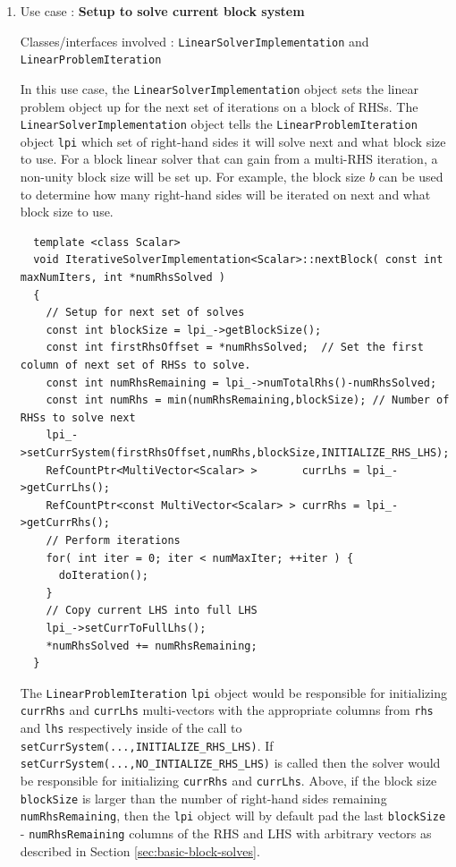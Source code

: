 \documentclass[pdf,ps2pdf,11pt]{SANDreport}
\begin{document}
\begin{enumerate}

{}\item Use case : \textbf{Setup to solve current block system}

{}\noindent{}Classes/interfaces involved :
{}\texttt{Linear\-Solver\-Implementation} and
{}\texttt{Linear\-Problem\-Iteration}

In this use case, the {}\texttt{Linear\-Solver\-Implementation} object
sets the linear problem object up for the next set of iterations on a
block of RHSs.  The {}\texttt{Linear\-Solver\-Implementation} object
tells the {}\texttt{Linear\-Problem\-Iteration} object {}\texttt{lpi}
which set of right-hand sides it will solve next and what block size
to use.  For a block linear solver that can gain from a multi-RHS
iteration, a non-unity block size will be set up.  For example, the
block size $b$ can be used to determine how many right-hand sides will
be iterated on next and what block size to use.

{\scriptsize\begin{verbatim}
  template <class Scalar>
  void IterativeSolverImplementation<Scalar>::nextBlock( const int maxNumIters, int *numRhsSolved )
  {
    // Setup for next set of solves
    const int blockSize = lpi_->getBlockSize();
    const int firstRhsOffset = *numRhsSolved;  // Set the first column of next set of RHSs to solve.
    const int numRhsRemaining = lpi_->numTotalRhs()-numRhsSolved;
    const int numRhs = min(numRhsRemaining,blockSize); // Number of RHSs to solve next
    lpi_->setCurrSystem(firstRhsOffset,numRhs,blockSize,INITIALIZE_RHS_LHS);
    RefCountPtr<MultiVector<Scalar> >       currLhs = lpi_->getCurrLhs();
    RefCountPtr<const MultiVector<Scalar> > currRhs = lpi_->getCurrRhs();
    // Perform iterations
    for( int iter = 0; iter < numMaxIter; ++iter ) {
      doIteration();
    }
    // Copy current LHS into full LHS
    lpi_->setCurrToFullLhs();
    *numRhsSolved += numRhsRemaining;
  }
\end{verbatim}}

{}\noindent{}The {}\texttt{Linear\-Problem\-Iteration} {}\texttt{lpi}
object would be responsible for initializing {}\texttt{currRhs} and
{}\texttt{currLhs} multi-vectors with the appropriate columns from
{}\texttt{rhs} and {}\texttt{lhs} respectively inside of the call to
{}\texttt{set\-Curr\-System(...,\-INITIALIZE\_\-RHS\_\-LHS)}.  If
{}\texttt{set\-Curr\-System(...,\-NO\_\-INTIALIZE\_\-RHS\_\-LHS)} is
called then the solver would be responsible for initializing
{}\texttt{currRhs} and {}\texttt{currLhs}.  Above, if the block size
{}\texttt{blockSize} is larger than the number of right-hand sides
remaining {}\texttt{num\-Rhs\-Remaining}, then the {}\texttt{lpi}
object will by default pad the last {}\texttt{blockSize} -
{}\texttt{num\-Rhs\-Remaining} columns of the RHS and LHS with
arbitrary vectors as described in Section
{}\ref{sec:basic-block-solves}.


\end{enumerate}
\end{document}
